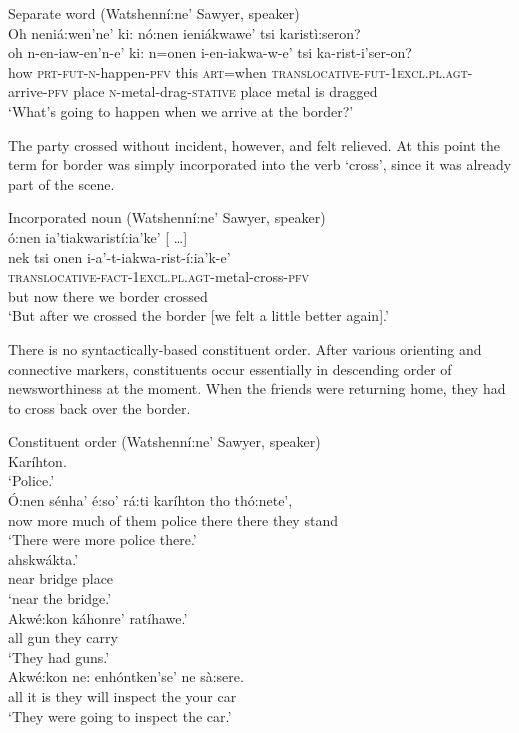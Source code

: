 \documentclass[output=paper,colorlinks,citecolor=brown]{langscibook}
\begin{document}
\ea Separate word (Watshenní:ne' Sawyer, speaker)\\
\glll  Oh   neniá:wen’ne’    ki: nó:nen  ieniákwawe’     tsi karistì:seron?\\
       oh   n-en-iaw-en’n-e’ ki: n=onen  i-en-iakwa-w-e’ tsi ka-rist-i’ser-on?\\
      how  \textsc{prt-fut-n}-happen-\textsc{pfv} this \textsc{art}=when \textsc{translocative-fut-1excl.pl.agt}-arrive-\textsc{pfv} place  \textsc{n}-metal-drag-\textsc{stative} place {metal is dragged}\\
\glt `What's going to happen when we arrive at the border?’
\z

The party crossed without incident, however, and felt relieved. At this point the term for border was simply incorporated into the verb `cross', since it was already part of the scene.

\ea Incorporated noun (Watshenní:ne' Sawyer, speaker)\\
  ó:nen                            {ia'tiakwaristí:ia'ke'  {[} \ldots {]}}\\
       {nek tsi}  onen                             i-a'-t-iakwa-rist-í:ia'k-e'\\ 
       {}         {}                               \textsc{translocative-fact-1excl.pl.agt}-metal-cross-\textsc{pfv}\\
       but        now                              {there we border crossed}\\
\glt  `But after we crossed the border {[}we felt a little better again{]}.'
\z

There is no syntactically-based constituent order. After various orienting and connective markers, constituents occur essentially in descending order of newsworthiness at the moment. When the friends were returning home, they had to cross back over the border.

\ea Constituent order (Watshenní:ne' Sawyer, speaker)\\
Karíhton.\\
\glt `Police.'\medskip\\
\gll Ó:nen sénha' é:so' rá:ti karíhton tho thó:nete',\\         
     now more much {of them} police there {there they stand}\\  
\glt `There were more police there.'\medskip\\
     ahskwákta.'\\         
     {near bridge place}\\ 
\glt `near the bridge.'\medskip\\
\gll Akwé:kon káhonre' ratíhawe.'\\ 
     all gun {they carry}\\         
\glt `They had guns.'\medskip\\
\gll Akwé:kon ne: enhóntken'se' ne sà:sere.\\
     all {it is} {they will inspect} the {your car}\\
\glt `They were going to inspect the car.'
\z
\end{document}
